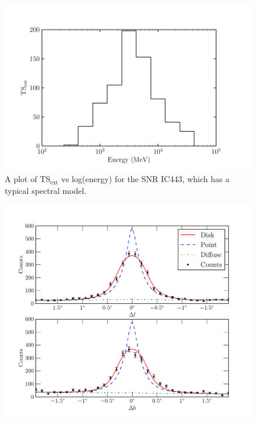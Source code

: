 \documentclass[12pt,preprint]{aastex}
\newcommand{\tsext}{{\ensuremath{\text{TS}_\text{ext}}}\xspace}
\begin{document}
\clearpage
\begin{figure}
  \begin{center}
    \includegraphics{ic443_plots/ic443_ts_ext_vs_energy.pdf}
    \caption{A plot of \tsext vs log(energy)
    for the SNR IC443, which has a typical spectral model.
    }
    \label{ts_ext_vs_energy}
  \end{center}
\end{figure}

\clearpage
\begin{figure}
  \begin{center}
    \includegraphics{ic443_plots/ic443_counts_slice.pdf}
    \caption{
    }
    \label{counts_slice}
  \end{center}
\end{figure}
\end{document}
